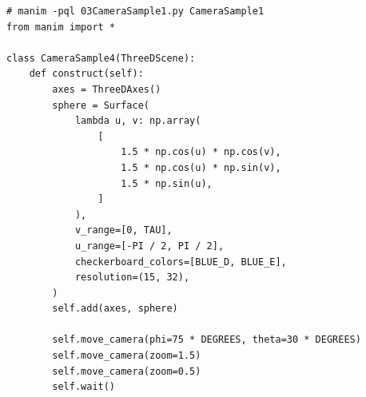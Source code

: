 \begin{lstlisting}[style=pythonstyle]
# manim -pql 03CameraSample1.py CameraSample1  
from manim import *

class CameraSample4(ThreeDScene):
    def construct(self):
        axes = ThreeDAxes()
        sphere = Surface(
            lambda u, v: np.array(
                [
                    1.5 * np.cos(u) * np.cos(v),
                    1.5 * np.cos(u) * np.sin(v),
                    1.5 * np.sin(u),
                ]
            ),
            v_range=[0, TAU],
            u_range=[-PI / 2, PI / 2],
            checkerboard_colors=[BLUE_D, BLUE_E],
            resolution=(15, 32),
        )
        self.add(axes, sphere)

        self.move_camera(phi=75 * DEGREES, theta=30 * DEGREES)
        self.move_camera(zoom=1.5)
        self.move_camera(zoom=0.5)
        self.wait()
\end{lstlisting}


